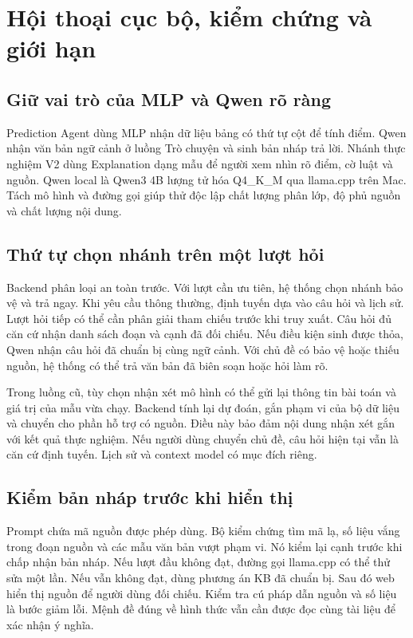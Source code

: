 \chapter{Hội thoại cục bộ, kiểm chứng và giới hạn}\label{pr:chat-control}

\section{Giữ vai trò của MLP và Qwen rõ ràng}
Prediction Agent dùng MLP nhận dữ liệu bảng có thứ tự cột để tính điểm. Qwen nhận văn bản ngữ cảnh ở luồng Trò chuyện và sinh bản nháp trả lời. Nhánh thực nghiệm V2 dùng Explanation dạng mẫu để người xem nhìn rõ điểm, cờ luật và nguồn. Qwen local là Qwen3 4B lượng tử hóa Q4\_K\_M qua llama.cpp trên Mac. Tách mô hình và đường gọi giúp thử độc lập chất lượng phân lớp, độ phủ nguồn và chất lượng nội dung.

\section{Thứ tự chọn nhánh trên một lượt hỏi}
Backend phân loại an toàn trước. Với lượt cần ưu tiên, hệ thống chọn nhánh bảo vệ và trả ngay. Khi yêu cầu thông thường, định tuyến dựa vào câu hỏi và lịch sử. Lượt hỏi tiếp có thể cần phân giải tham chiếu trước khi truy xuất. Câu hỏi đủ căn cứ nhận danh sách đoạn và cạnh đã đối chiếu. Nếu điều kiện sinh được thỏa, Qwen nhận câu hỏi đã chuẩn bị cùng ngữ cảnh. Với chủ đề có bảo vệ hoặc thiếu nguồn, hệ thống có thể trả văn bản đã biên soạn hoặc hỏi làm rõ.

Trong luồng cũ, tùy chọn nhận xét mô hình có thể gửi lại thông tin bài toán và giá trị của mẫu vừa chạy. Backend tính lại dự đoán, gắn phạm vi của bộ dữ liệu và chuyển cho phần hỗ trợ có nguồn. Điều này bảo đảm nội dung nhận xét gắn với kết quả thực nghiệm. Nếu người dùng chuyển chủ đề, câu hỏi hiện tại vẫn là căn cứ định tuyến. Lịch sử và context model có mục đích riêng.

\section{Kiểm bản nháp trước khi hiển thị}
Prompt chứa mã nguồn được phép dùng. Bộ kiểm chứng tìm mã lạ, số liệu vắng trong đoạn nguồn và các mẫu văn bản vượt phạm vi. Nó kiểm lại cạnh trước khi chấp nhận bản nháp. Nếu lượt đầu không đạt, đường gọi llama.cpp có thể thử sửa một lần. Nếu vẫn không đạt, dùng phương án KB đã chuẩn bị. Sau đó web hiển thị nguồn để người dùng đối chiếu. Kiểm tra cú pháp dẫn nguồn và số liệu là bước giảm lỗi. Mệnh đề đúng về hình thức vẫn cần được đọc cùng tài liệu để xác nhận ý nghĩa.

